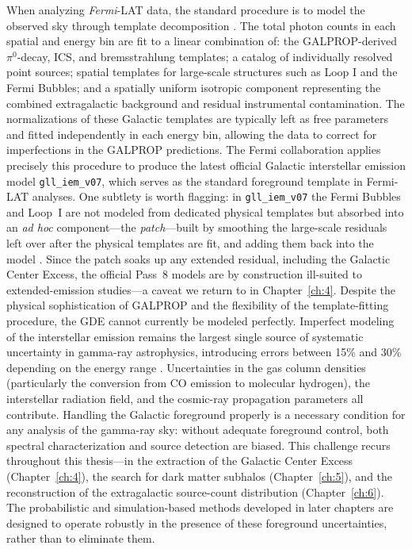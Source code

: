 When analyzing \textit{Fermi}-LAT data, the standard procedure is to model the observed sky through template decomposition \cite{Fermi-LAT:2014ryh}.
The total photon counts in each spatial and energy bin are fit to a linear combination of: the GALPROP-derived $\pi^0$-decay, ICS, and bremsstrahlung templates; a catalog of individually resolved point sources; spatial templates for large-scale structures such as Loop I and the Fermi Bubbles; and a spatially uniform isotropic component representing the combined extragalactic background and residual instrumental contamination.
The normalizations of these Galactic templates are typically left as free parameters and fitted independently in each energy bin, allowing the data to correct for imperfections in the GALPROP predictions.
The Fermi collaboration applies precisely this procedure to produce the latest official Galactic interstellar emission model \texttt{gll\_iem\_v07}, which serves as the standard foreground template in Fermi-LAT analyses.
One subtlety is worth flagging: in \texttt{gll\_iem\_v07} the Fermi Bubbles and Loop~I are not modeled from dedicated physical templates but absorbed into an \emph{ad hoc} component---the \emph{patch}---built by smoothing the large-scale residuals left over after the physical templates are fit, and adding them back into the model \cite{Fermi-LAT:2019yla,Fermi-LAT:2022byn}.
Since the patch soaks up any extended residual, including the Galactic Center Excess, the official Pass~8 models are by construction ill-suited to extended-emission studies---a caveat we return to in Chapter~\ref{ch:4}.
Despite the physical sophistication of GALPROP and the flexibility of the template-fitting procedure, the GDE cannot currently be modeled perfectly.
Imperfect modeling of the interstellar emission remains the largest single source of systematic uncertainty in gamma-ray astrophysics, introducing errors between 15\% and 30\% depending on the energy range \cite{Fermi-LAT:2014ryh,DGRB-review}.
Uncertainties in the gas column densities (particularly the conversion from CO emission to molecular hydrogen), the interstellar radiation field, and the cosmic-ray propagation parameters all contribute.
Handling the Galactic foreground properly is a necessary condition for any analysis of the gamma-ray sky: without adequate foreground control, both spectral characterization and source detection are biased.
This challenge recurs throughout this thesis---in the extraction of the Galactic Center Excess (Chapter~\ref{ch:4}), the search for dark matter subhalos (Chapter~\ref{ch:5}), and the reconstruction of the extragalactic source-count distribution (Chapter~\ref{ch:6}).
The probabilistic and simulation-based methods developed in later chapters are designed to operate robustly in the presence of these foreground uncertainties, rather than to eliminate them.
